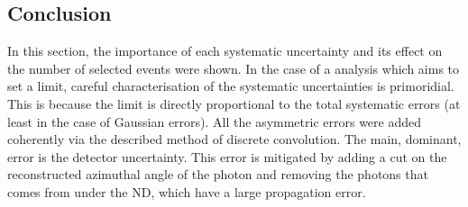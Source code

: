 \subsection{Conclusion}
In this section, the importance of each systematic uncertainty and its
effect on the number of selected events were shown. In the case of a
analysis which aims to set a limit, careful characterisation of the
systematic uncertainties is primoridial. This is because the limit is
directly proportional to the total systematic errors (at least in the
case of Gaussian errors). All the asymmetric errors were added
coherently via the described method of discrete convolution. The main,
dominant, error is the detector uncertainty. This error is mitigated
by adding a cut on the reconstructed azimuthal angle of the photon and
removing the photons that comes from under the \Gls{ND}, which have a
large propagation error.

